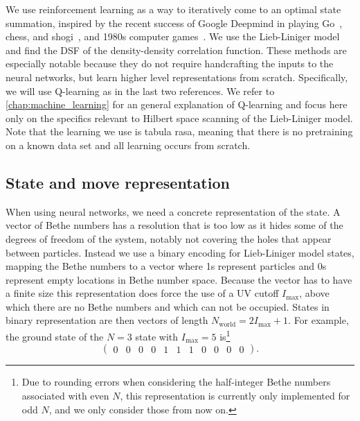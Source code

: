 \documentclass[11pt, a4paper]{report} %
\begin{document}
We use reinforcement learning as a way to iteratively come to an optimal state summation, inspired by the recent success of Google Deepmind in playing Go~\cite{silver16_master_game_go_with_deep,Silver2017a}, chess, and shogi~\cite{Silver2017}, and 1980s computer games~\cite{mnih13_playin_atari_with_deep_reinf_learn,mnih15_human_level_contr_throug_deep_reinf_learn}.
We use the Lieb-Liniger model and find the DSF of the density-density correlation function.
These methods are especially notable because they do not require handcrafting the inputs to the neural networks, but learn higher level representations from scratch.
Specifically, we will use Q-learning as in the last two references.
We refer to \cref{chap:machine_learning} for an general explanation of Q-learning and focus here only on the specifics relevant to Hilbert space scanning of the Lieb-Liniger model.
Note that the learning we use is tabula rasa, meaning that there is no pretraining on a known data set and all learning occurs from scratch.

\subsection{State and move representation}

When using neural networks, we need a concrete representation of the state.
A vector of Bethe numbers has a resolution that is too low as it hides some of the degrees of freedom of the system, notably not covering the holes that appear between particles.
Instead we use a binary encoding for Lieb-Liniger model states, mapping the Bethe numbers to a vector where 1s represent particles and 0s represent empty locations in Bethe number space.
Because the vector has to have a finite size this representation does force the use of a UV cutoff \(I_{\max}\), above which there are no Bethe numbers and which can not be occupied.
States in binary representation are then vectors of length $N_{\textrm{world}} = 2 I_{\max} + 1$.
For example, the ground state of the $N=3$ state with $I_{\max} = 5$ is\footnote{Due to rounding errors when considering the half-integer Bethe numbers associated with even \(N\), this representation is currently only implemented for odd \(N\), and we only consider those from now on.}
\begin{equation}
  \label{eq:representation}
  \begin{pmatrix} 0 & 0 & 0 & 0 & 1 & 1 & 1 & 0 & 0 & 0 & 0 \end{pmatrix}.
\end{equation}
\end{document}
